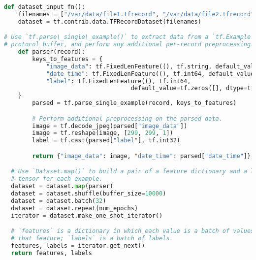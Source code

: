 \begin{lstlisting}[language=Python]
def dataset_input_fn():
    filenames = ["/var/data/file1.tfrecord", "/var/data/file2.tfrecord"]
    dataset = tf.contrib.data.TFRecordDataset(filenames)

# Use `tf.parse\_single\_example()` to extract data from a `tf.Example`
# protocol buffer, and perform any additional per-record preprocessing.
    def parser(record):
        keys_to_features = {
            "image_data": tf.FixedLenFeature((), tf.string, default_value=""),
            "date_time": tf.FixedLenFeature((), tf.int64, default_value=""),
            "label": tf.FixedLenFeature((), tf.int64,
                                    default_value=tf.zeros([], dtype=tf.int64)),
    }
        parsed = tf.parse_single_example(record, keys_to_features)

        # Perform additional preprocessing on the parsed data.
        image = tf.decode_jpeg(parsed["image_data"])
        image = tf.reshape(image, [299, 299, 1])
        label = tf.cast(parsed["label"], tf.int32)

        return {"image_data": image, "date_time": parsed["date_time"]}, label

  # Use `Dataset.map()` to build a pair of a feature dictionary and a label 
  # tensor for each example.
  dataset = dataset.map(parser)
  dataset = dataset.shuffle(buffer_size=10000)
  dataset = dataset.batch(32)
  dataset = dataset.repeat(num_epochs)
  iterator = dataset.make_one_shot_iterator()

  # `features` is a dictionary in which each value is a batch of values for
  # that feature; `labels` is a batch of labels.
  features, labels = iterator.get_next()
  return features, labels
\end{lstlisting}
